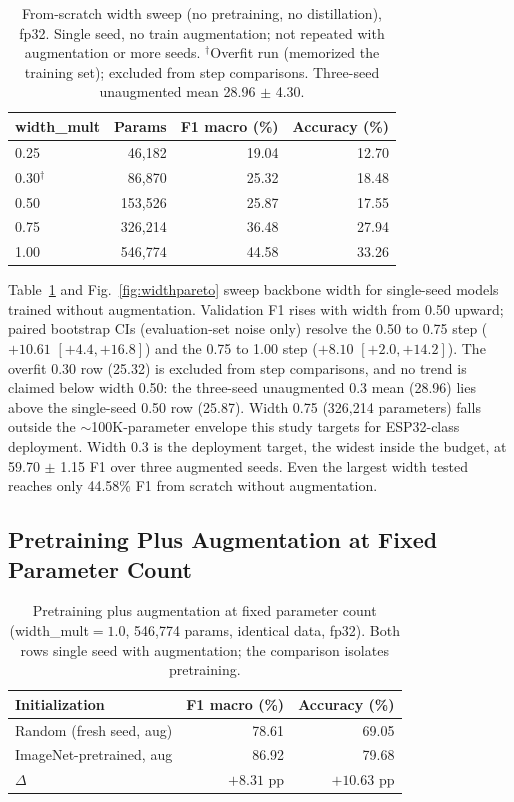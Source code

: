 \documentclass[conference]{IEEEtran}
\begin{document}
	\begin{table}[h]
		\caption{From-scratch width sweep (no pretraining, no distillation), fp32. Single seed, no train augmentation; not repeated with augmentation or more seeds. $^\dagger$Overfit run (memorized the training set); excluded from step comparisons. Three-seed unaugmented mean 28.96 $\pm$ 4.30.}
		\label{tab:widthsweep}
		\centering
		\begin{tabular}{lrrr}
			\toprule
			width\_mult & Params & F1 macro (\%) & Accuracy (\%) \\
			\midrule
			0.25 & 46{,}182   & 19.04 & 12.70 \\
			0.30$^\dagger$ & 86{,}870   & 25.32 & 18.48 \\
			0.50 & 153{,}526  & 25.87 & 17.55 \\
			0.75 & 326{,}214  & 36.48 & 27.94 \\
			1.00 & 546{,}774  & 44.58 & 33.26 \\
			\bottomrule
		\end{tabular}
	\end{table}
	
	Table~\ref{tab:widthsweep} and Fig.~\ref{fig:widthpareto} sweep backbone width for single-seed models trained without augmentation. Validation F1 rises with width from 0.50 upward; paired bootstrap CIs (evaluation-set noise only) resolve the 0.50 to 0.75 step ($+10.61$ $[+4.4,+16.8]$) and the 0.75 to 1.00 step ($+8.10$ $[+2.0,+14.2]$). The overfit 0.30 row (25.32) is excluded from step comparisons, and no trend is claimed below width 0.50: the three-seed unaugmented 0.3 mean (28.96) lies above the single-seed 0.50 row (25.87). Width 0.75 (326{,}214 parameters) falls outside the $\sim$100K-parameter envelope this study targets for ESP32-class deployment. Width 0.3 is the deployment target, the widest inside the budget, at 59.70 $\pm$ 1.15 F1 over three augmented seeds. Even the largest width tested reaches only 44.58\% F1 from scratch without augmentation.
	
	\subsection{Pretraining Plus Augmentation at Fixed Parameter Count}
	
	\begin{table}[h]
		\caption{Pretraining plus augmentation at fixed parameter count (width\_mult$=1.0$, 546{,}774 params,
			identical data, fp32). Both rows single seed with augmentation; the comparison isolates pretraining.}
		\label{tab:pretrainisolation}
		\centering
		\begin{tabular}{lrr}
			\toprule
			Initialization & F1 macro (\%) & Accuracy (\%) \\
			\midrule
			Random (fresh seed, aug) & 78.61 & 69.05 \\
			ImageNet-pretrained, aug & 86.92 & 79.68 \\
			\midrule
			$\Delta$ & $+8.31$ pp & $+10.63$ pp \\
			\bottomrule
		\end{tabular}
	\end{table}
	
\end{document}
